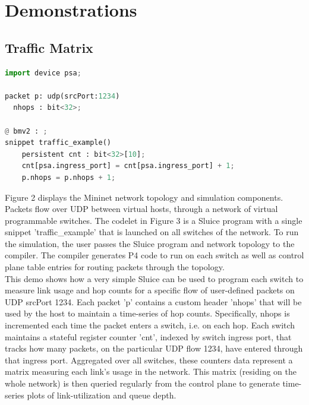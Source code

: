 

\section{Demonstrations}

\subsection{Traffic Matrix}

\begin{lstlisting}[language=Python, basicstyle=\scriptsize]
import device psa;

packet p: udp(srcPort:1234)
  nhops : bit<32>;

@ bmv2 : ;
snippet traffic_example()
	persistent cnt : bit<32>[10];
	cnt[psa.ingress_port] = cnt[psa.ingress_port] + 1;
	p.nhops = p.nhops + 1;
\end{lstlisting}

\noindent Figure 2 displays the Mininet network topology and simulation components. Packets flow over UDP between virtual hosts, through a network of virtual programmable switches. The codelet in Figure 3 is a Sluice program with a single snippet 'traffic\_example' that is launched on all switches of the network. To run the simulation, the user passes the Sluice program and network topology to the compiler. The compiler generates P4 code to run on each switch as well as control plane table entries for routing packets through the topology.  \\
\indent This demo shows how a very simple Sluice can be used to program each switch to measure link usage and hop counts for a specific flow of user-defined packets on UDP srcPort 1234. Each packet 'p' contains a custom header 'nhops' that will be used by the host to maintain a time-series of hop counts. Specifically, nhops is incremented each time the packet enters a switch, i.e. on each hop. Each switch maintains a stateful register counter 'cnt', indexed by switch ingress port, that tracks how many packets, on the particular UDP flow 1234, have entered through that ingress port. Aggregated over all switches, these counters data represent a matrix measuring each link's usage in the network. This matrix (residing on the whole network) is then queried regularly from the control plane to generate time-series plots of link-utilization and queue depth.  
 
    
